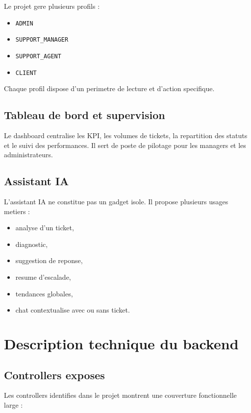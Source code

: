 \documentclass[12pt,a4paper]{article}
\begin{document}
Le projet gere plusieurs profils :

\begin{itemize}[leftmargin=1.2cm]
  \item \texttt{ADMIN}
  \item \texttt{SUPPORT\_MANAGER}
  \item \texttt{SUPPORT\_AGENT}
  \item \texttt{CLIENT}
\end{itemize}

Chaque profil dispose d'un perimetre de lecture et d'action specifique.

\subsection{Tableau de bord et supervision}

Le dashboard centralise les KPI, les volumes de tickets, la repartition des statuts et le suivi des performances. Il sert de poste de pilotage pour les managers et les administrateurs.

\subsection{Assistant IA}

L'assistant IA ne constitue pas un gadget isole. Il propose plusieurs usages metiers :

\begin{itemize}[leftmargin=1.2cm]
  \item analyse d'un ticket,
  \item diagnostic,
  \item suggestion de reponse,
  \item resume d'escalade,
  \item tendances globales,
  \item chat contextualise avec ou sans ticket.
\end{itemize}

\section{Description technique du backend}

\subsection{Controllers exposes}

Les controllers identifies dans le projet montrent une couverture fonctionnelle large :
\end{document}
